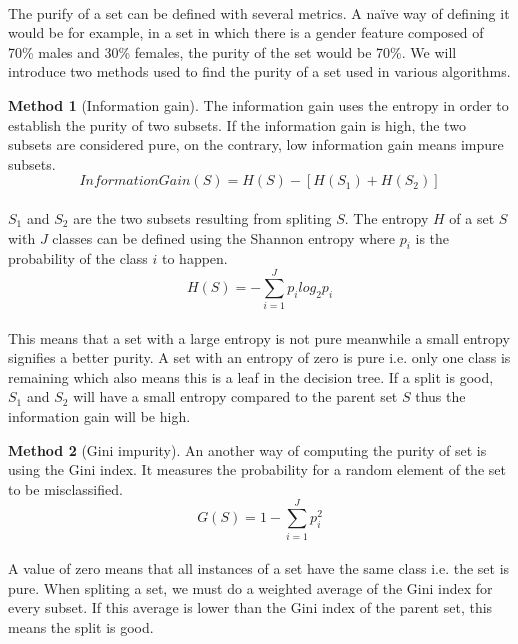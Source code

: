 \documentclass[12pt]{report}
\theoremstyle{definition}
\theoremstyle{definition}
\theoremstyle{definition}
\newtheorem*{method}{Method}
\begin{document}
\paragraph{} The purify of a set can be defined with several metrics. A naïve way of defining it would be for
example, in a set in which there is a gender feature composed of 70\% males and 30\% females, the purity of
the set would be 70\%. We will introduce two methods used to find the purity of a set used in various algorithms.
\begin{method}[Information gain]
    The information gain uses the entropy in order to establish the purity of two subsets. If the information
    gain is high, the two subsets are considered pure, on the contrary, low information gain means impure
    subsets.
    \begin{displaymath}
        InformationGain(S) = H(S) - [H(S_1) + H(S_2)]
    \end{displaymath}
    \paragraph{} $S_1$ and $S_2$ are the two subsets resulting from spliting $S$. The entropy $H$ of a set $S$
    with $J$ classes can be defined using the Shannon entropy where $p_i$ is the probability of the class $i$
    to happen.
    \begin{displaymath}
        H(S) = - \sum_{i=1}^{J} p_i log_2 p_i
    \end{displaymath}

\paragraph{} This means that a set with a large entropy is not pure meanwhile a small entropy signifies a
better purity. A set with an entropy of zero is pure i.e. only one class is remaining which also means this
is a leaf in the decision tree. If a split is good, $S_1$ and $S_2$ will have a small entropy compared to the
parent set $S$ thus the information gain will be high.
\end{method}

\begin{method}[Gini impurity]
    An another way of computing the purity of set is using the Gini index. It measures the probability for a
    random element of the set to be misclassified.
    \begin{displaymath}
        G(S) = 1 - \sum_{i=1}^{J} p_i^2
    \end{displaymath}
\paragraph{} A value of zero means that all instances of a set have the same class i.e. the set is pure.
When spliting a set, we must do a weighted average of the Gini index for every subset. If this average is lower
than the Gini index of the parent set, this means the split is good.
\end{method}
\end{document}
